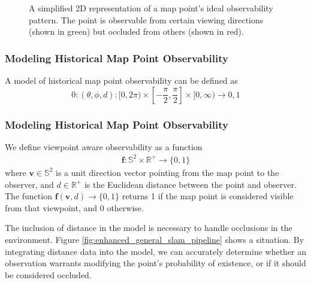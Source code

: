 \begin{figure}[!ht]
    \centering
    \caption{A simplified 2D representation of a map point's ideal observability pattern. The point is observable from certain viewing directions (shown in green) but occluded from others (shown in red).}
    \label{fig:2d_observability}
\end{figure}

\subsubsection{Modeling Historical Map Point Observability}

A model of historical map point observability can be defined as
$$
    0:(\theta,\phi,d):[0,2\pi)\times\left[-\frac{\pi}{2},\frac{\pi}{2}\right]\times[0,\infty)\to{0,1}
$$

\subsubsection{Modeling Historical Map Point Observability}
\label{sec:observability_models}

We define viewpoint aware observability as a function
\begin{align*}
    \boldsymbol{f:}\mathbb{S}^2\times\mathbb{R}^+\rightarrow\{0,1\}
\end{align*}
where $\mathbf{v}\in\mathbb{S}^2$ is a unit direction vector pointing from the map point to the observer, and $d\in\mathbb{R}^+$ is the Euclidean distance between the point and observer. The function $\boldsymbol{f}(\mathbf{v}, d)\rightarrow\{0,1\}$ returns 1 if the map point is considered visible from that viewpoint, and 0 otherwise.


The inclusion of distance in the model is necessary to handle occlusions in the environment. Figure \ref{fig:enhanced_general_slam_pipeline} shows a situation. By integrating distance data into the model, we can accurately determine whether an observation warrants modifying the point's probability of existence, or if it should be considered occluded.


